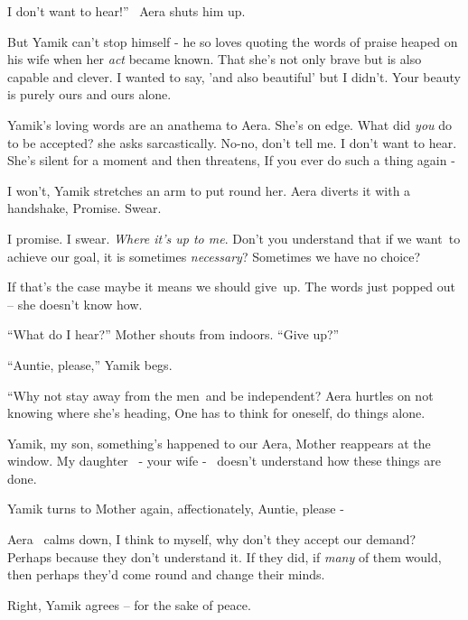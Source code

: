 \documentclass[letterpaper]{article}
\begin{document}
{\textquotedbl}I don't want to hear!'' \ Aera shuts him up. 

But Yamik can't stop himself - he so loves quoting the words of praise heaped on his wife when her \textit{act} became
known. {\textquotedbl}That she's not only brave but is also capable and clever. I wanted to say, 'and also beautiful'
but I didn't. Your beauty is purely ours and ours alone.{\textquotedbl} ~

Yamik's loving words are an anathema to Aera. She's on edge. {\textquotedbl}What did \textit{you} do to be
accepted?{\textquotedbl} she asks sarcastically. {\textquotedbl}No-no, don't tell me. I don't want to
hear.{\textquotedbl} She's silent for a moment and then threatens, {\textquotedbl}If you ever do such a thing again
-{\textquotedbl}

{\textquotedbl}I won't,{\textquotedbl} Yamik stretches an arm to put round her. Aera diverts it with a handshake,
{\textquotedbl}Promise. Swear.{\textquotedbl} 

{\textquotedbl}I promise. I swear. \textit{Where it's up to me}. Don't you understand that if we want~to achieve our
goal, it is sometimes \textit{necessary}? Sometimes we have no choice?{\textquotedbl} 

{\textquotedbl}If that's the case maybe it means we should give~up.{\textquotedbl} The words just popped out -- she
doesn't know how.

{}``What do I hear?'' Mother shouts from indoors. ``Give up?'' 

{}``Auntie, please,'' Yamik begs.

{}``Why not stay away from the men~and be independent?{\textquotedbl} Aera hurtles on not knowing where she's heading,
{\textquotedbl}One has to think for oneself, do things alone.{\textquotedbl}

{\textquotedbl}Yamik, my son, something's happened to our Aera,{\textquotedbl} Mother reappears at the window.
{\textquotedbl}My daughter \ {}- your wife - \ doesn't understand how these things are done.{\textquotedbl} 

Yamik turns to Mother again, affectionately, {\textquotedbl}Auntie, please -{\textquotedbl}

Aera \ calms down, {\textquotedbl}I think to myself, why don't they accept our demand? Perhaps because they don't
understand it. If they did, if \textit{many} of them would, then perhaps they'd come round and change their
minds.{\textquotedbl} 

{\textquotedbl}Right,{\textquotedbl} Yamik agrees -- for the sake of peace.
\end{document}
